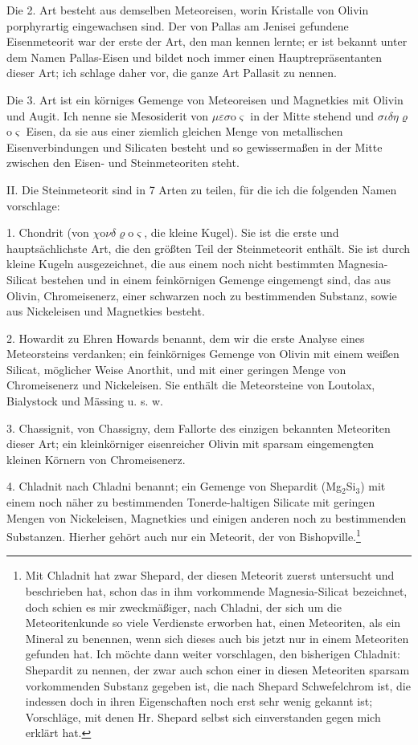 \documentclass[a4paper, 11pt, oneside]{article}
\begin{document}
Die 2. Art besteht aus demselben Meteoreisen, worin Kristalle von Olivin porphyrartig eingewachsen sind. Der von Pallas am Jenisei gefundene Eisenmeteorit war der erste der Art, den man kennen lernte; er ist bekannt unter dem Namen Pallas-Eisen und bildet noch immer einen Hauptrepräsentanten dieser Art; ich schlage daher vor, die ganze Art Pallasit zu nennen.

Die 3. Art ist ein körniges Gemenge von Meteoreisen und Magnetkies mit Olivin und Augit. Ich nenne sie Mesosiderit von $\mu\varepsilon\sigma$o$\varsigma$ in der Mitte stehend und $\sigma\iota\delta\eta\varrho$o$\varsigma$ Eisen, da sie aus einer ziemlich gleichen Menge von metallischen Eisenverbindungen und Silicaten besteht und so gewissermaßen in der Mitte zwischen den Eisen- und Steinmeteoriten steht.

II. Die Steinmeteorit sind in 7 Arten zu teilen, für die ich die folgenden Namen vorschlage:


1. Chondrit (von $\chi$o$\nu\delta\varrho$o$\varsigma$, die kleine Kugel). Sie ist die erste und hauptsächlichste Art, die den größten Teil der Steinmeteorit enthält. Sie ist durch kleine Kugeln ausgezeichnet, die aus einem noch nicht bestimmten Magnesia-Silicat bestehen und in einem feinkörnigen Gemenge eingemengt sind, das aus Olivin, Chromeisenerz, einer schwarzen noch zu bestimmenden Substanz, sowie aus Nickeleisen und Magnetkies besteht.

2. Howardit zu Ehren Howards benannt, dem wir die erste Analyse eines Meteorsteins verdanken; ein feinkörniges Gemenge von Olivin mit einem weißen Silicat, möglicher Weise Anorthit, und mit einer geringen Menge von Chromeisenerz und Nickeleisen. Sie enthält die Meteorsteine von Loutolax, Bialystock und Mässing u. s. w.

3. Chassignit, von Chassigny, dem Fallorte des einzigen bekannten Meteoriten dieser Art; ein kleinkörniger eisenreicher Olivin mit sparsam eingemengten kleinen Körnern von Chromeisenerz.

4. Chladnit nach Chladni benannt; ein Gemenge von Shepardit (Mg$_{2}$Si$_{3}$) mit einem noch näher zu bestimmenden Tonerde-haltigen Silicate mit geringen Mengen von Nickeleisen, Magnetkies und einigen anderen noch zu bestimmenden Substanzen. Hierher gehört auch nur ein Meteorit, der von Bishopville.\footnote{Mit Chladnit hat zwar Shepard, der diesen Meteorit zuerst untersucht und beschrieben hat, schon das in ihm vorkommende Magnesia-Silicat bezeichnet, doch schien es mir zweckmäßiger, nach Chladni, der sich um die Meteoritenkunde so viele Verdienste erworben hat, einen Meteoriten, als ein Mineral zu benennen, wenn sich dieses auch bis jetzt nur in einem Meteoriten gefunden hat. Ich möchte dann weiter vorschlagen, den bisherigen Chladnit: Shepardit zu nennen, der zwar auch schon einer in diesen Meteoriten sparsam vorkommenden Substanz gegeben ist, die nach Shepard Schwefelchrom ist, die indessen doch in ihren Eigenschaften noch erst sehr wenig gekannt ist; Vorschläge, mit denen Hr. Shepard selbst sich einverstanden gegen mich erklärt hat.}
\end{document}
